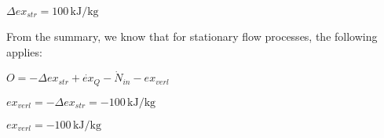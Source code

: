 \( \Delta ex_{str} = 100 \, \text{kJ/kg} \)  

From the summary, we know that for stationary flow processes, the following applies:  

\( O = -\Delta ex_{str} + \dot{ex}_Q - \dot{N}_{in} - ex_{verl} \)  

\( ex_{verl} = -\Delta ex_{str} = -100 \, \text{kJ/kg} \)  

\( ex_{verl} = -100 \, \text{kJ/kg} \)